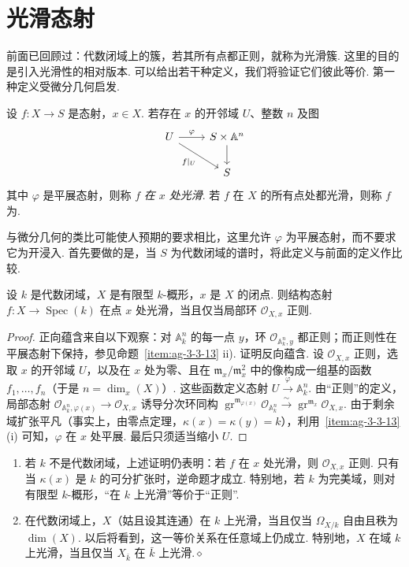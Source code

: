 \section{光滑态射}\label{sec:ag-3-4}
前面已回顾过：代数闭域上的簇，若其所有点都正则，就称为光滑簇. 这里的目的是引入光滑性的相对版本. 可以给出若干种定义，我们将验证它们彼此等价.
第一种定义受微分几何启发.
\begin{definition}\label{item:ag-3-4-1}
设 $f:X\longrightarrow S$ 是态射，$x\in X$. 若存在 $x$ 的开邻域 $U$、整数 $n$ 及图
\begin{align*}
\begin{tikzcd}[ampersand replacement=\&]
U\arrow[r,"\varphi"]\arrow[dr,"f|_U"'] \& S\times\mathbb A^n\arrow[d]\\
\& S
\end{tikzcd}
\end{align*}
其中 $\varphi$ 是平展态射，则称 $f$ \emph{在 $x$ 处光滑}. 若 $f$ 在 $X$ 的所有点处都光滑，则称 $f$ 为.
\end{definition}
与微分几何的类比可能使人预期的要求相比，这里允许 $\varphi$ 为平展态射，而不要求它为开浸入. 首先要做的是，当 $S$ 为代数闭域的谱时，将此定义与前面的定义作比较.
\begin{proposition}\label{item:ag-3-4-2}
设 $k$ 是代数闭域，$X$ 是有限型 $k$-概形，$x$ 是 $X$ 的闭点. 则结构态射 $f:X\longrightarrow\operatorname{Spec}(k)$ 在点 $x$ 处光滑，当且仅当局部环 $\mathcal O_{X,x}$ 正则.
\end{proposition}
\begin{proof}
正向蕴含来自以下观察：对 $\mathbb A_k^n$ 的每一点 $y$，环 $\mathcal O_{\mathbb A_k^n,y}$ 都正则；而正则性在平展态射下保持，参见命题~\ref{item:ag-3-3-13} ii).
证明反向蕴含. 设 $\mathcal O_{X,x}$ 正则，选取 $x$ 的开邻域 $U$，以及在 $x$ 处为零、且在 $\mathfrak m_x/\mathfrak m_x^2$ 中的像构成一组基的函数 $f_1,\ldots,f_n$（于是 $n=\dim_x(X)$）. 这些函数定义态射 $U\xrightarrow\varphi\mathbb A_k^n$. 由``正则''的定义，局部态射 $\mathcal O_{\mathbb A_k^n,\varphi(x)}\longrightarrow\mathcal O_{X,x}$ 诱导分次环同构 $\operatorname{gr}^{\mathfrak m_{\varphi(x)}}\mathcal O_{\mathbb A_k^n}\xrightarrow\sim\operatorname{gr}^{\mathfrak m_x}\mathcal O_{X,x}$. 由于剩余域扩张平凡（事实上，由零点定理，$\kappa(x)=\kappa(y)=k$），利用~\ref{item:ag-3-3-13}(i) 可知，$\varphi$ 在 $x$ 处平展. 最后只须适当缩小 $U$.
\end{proof}
\begin{remark}\label{item:ag-3-4-3}
\begin{enumerate}[label=(\roman*)]
\item 若 $k$ 不是代数闭域，上述证明仍表明：若 $f$ 在 $x$ 处光滑，则 $\mathcal O_{X,x}$ 正则. 只有当 $\kappa(x)$ 是 $k$ 的可分扩张时，逆命题才成立. 特别地，若 $k$ 为完美域，则对有限型 $k$-概形，``在 $k$ 上光滑''等价于``正则''.
\item 在代数闭域上，$X$（姑且设其连通）在 $k$ 上光滑，当且仅当 $\Omega_{X/k}$ 自由且秩为 $\dim(X)$. 以后将看到，这一等价关系在任意域上仍成立. 特别地，$X$ 在域 $k$ 上光滑，当且仅当 $X_{\bar k}$ 在 $\bar k$ 上光滑.\unskip\nobreak\hfill\ensuremath{\diamond}
\end{enumerate}
\renewcommand{\envenddiamond}{}
\end{remark}
